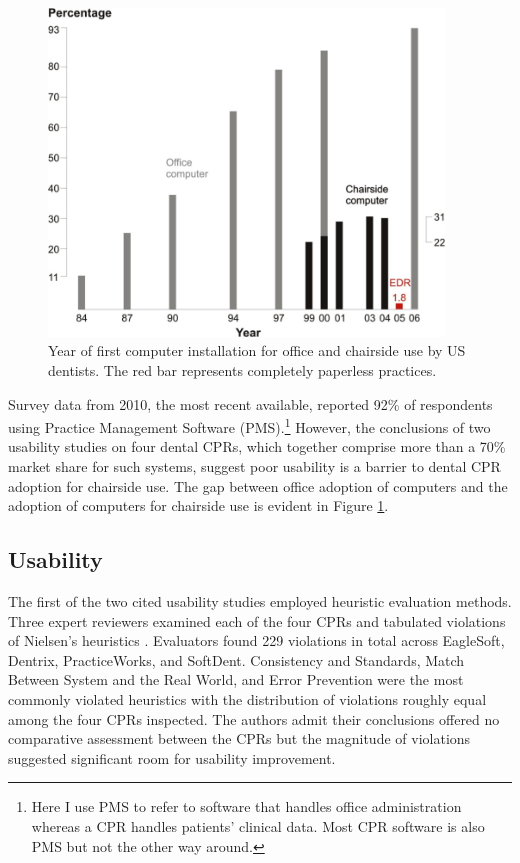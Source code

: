\documentclass[11pt]{article}
\begin{document}
\begin{figure}[!h]
\begin{center}
\includegraphics[width=105mm]{comp.png}
\end{center}
\caption{Year of first computer installation for office and chairside use by US dentists\cite{Schleyer2006Clinical-Comput}. The red bar represents completely paperless practices.}
\label{adoption}
\end{figure} 
\newpage

\noindent Survey data from 2010, the most recent available, reported 92\% of respondents using Practice Management Software (PMS)\cite{Levine2010}.\footnote[2]{Here I use PMS to refer to software that handles office administration whereas a CPR handles patients' clinical data. Most CPR software is also PMS but not the other way around.} However, the conclusions of two usability studies on four dental CPRs, which together comprise more than a 70\% market share for such systems, suggest poor usability is a barrier to dental CPR adoption for chairside use\cite{Thyvalikakath2007Heuristic-evalu,Thyvalikakath2008A-usability-eva}. The gap between office adoption of computers and the adoption of computers for chairside use is evident in Figure \ref{adoption}.

\subsection{Usability}
The first of the two cited usability studies employed heuristic evaluation methods\cite{Nielsen1994Usability-Inspe, Schleyer:2007fk}. Three expert reviewers examined each of the four CPRs and tabulated violations of Nielsen's heuristics \cite{Thyvalikakath:2009fk}. Evaluators found 229 violations in total across EagleSoft, Dentrix, PracticeWorks, and SoftDent. Consistency and Standards, Match Between System and the Real World, and Error Prevention were the most commonly violated heuristics with the distribution of violations roughly equal among the four CPRs inspected. The authors admit their conclusions offered no comparative assessment between the CPRs but the magnitude of violations suggested significant room for usability improvement.
\end{document}
